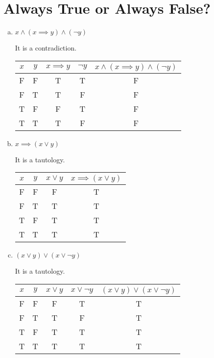 \documentclass{article}
\begin{document}
\section{Always True or Always False?}

\begin{enumerate}[(a)]
    \item $x \land (x \implies y) \land (\neg y)$
    
    It is a contradiction.
    
    \begin{tabular}{|c|c|c|c|c|}
        \hline
        $x$ & $y$ & $x \implies y$ & $\neg y$ & $x \land (x \implies y) \land (\neg y)$ \\
        \hline
        F & F & T & T & F \\
        F & T & T & F & F \\
        T & F & F & T & F \\
        T & T & T & F & F \\
        \hline
    \end{tabular}
    
    \item $x \implies (x \lor y)$
    
    It is a tautology.
    
    \begin{tabular}{|c|c|c|c|}
        \hline
        $x$ & $y$ & $x \lor y$ & $x \implies (x \lor y)$ \\
        \hline
        F & F & F & T \\
        F & T & T & T \\
        T & F & T & T \\
        T & T & T & T \\
        \hline
    \end{tabular}
    
    \item $(x \lor y) \lor (x \lor \neg y)$
    
    It is a tautology.
    
    \begin{tabular}{|c|c|c|c|c|}
        \hline
        $x$ & $y$ & $x \lor y$ & $x \lor \neg y$ & $(x \lor y) \lor (x \lor \neg y)$ \\
        \hline
        F & F & F & T & T \\
        F & T & T & F & T \\
        T & F & T & T & T \\
        T & T & T & T & T \\
        \hline
    \end{tabular}
    

\end{enumerate}
\end{document}
